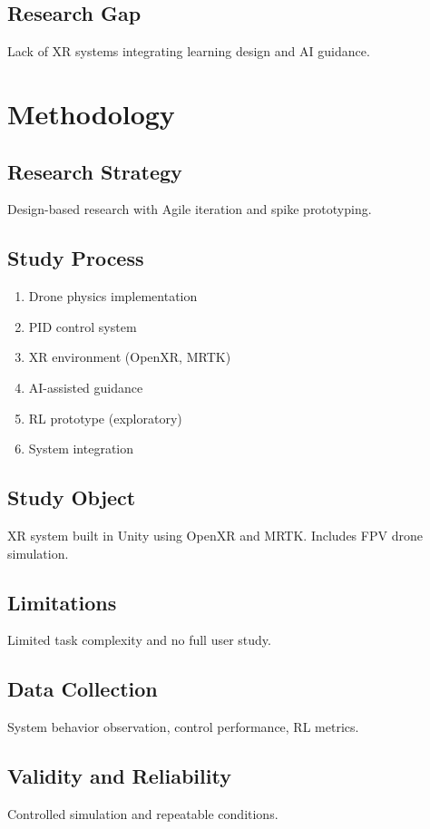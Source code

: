 \documentclass[12pt]{article}
\begin{document}
\subsection{Research Gap}
Lack of XR systems integrating learning design and AI guidance.
\newpage
\section{Methodology}

\subsection{Research Strategy}
Design-based research with Agile iteration and spike prototyping.

\subsection{Study Process}
\begin{enumerate}
    \item Drone physics implementation
    \item PID control system
    \item XR environment (OpenXR, MRTK)
    \item AI-assisted guidance
    \item RL prototype (exploratory)
    \item System integration
\end{enumerate}

\subsection{Study Object}
XR system built in Unity using OpenXR and MRTK. Includes FPV drone simulation.

\subsection{Limitations}
Limited task complexity and no full user study.

\subsection{Data Collection}
System behavior observation, control performance, RL metrics.

\subsection{Validity and Reliability}
Controlled simulation and repeatable conditions.
\end{document}
